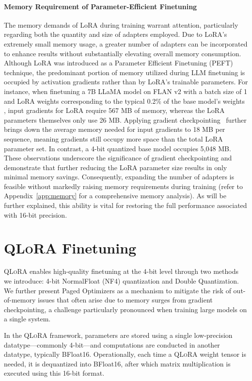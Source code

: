 \paragraph{Memory Requirement of Parameter-Efficient Finetuning} The memory demands of LoRA during training warrant attention, particularly regarding both the quantity and size of adapters employed. Due to LoRA’s extremely small memory usage, a greater number of adapters can be incorporated to enhance results without substantially elevating overall memory consumption. Although LoRA was introduced as a Parameter Efficient Finetuning (PEFT) technique, the predominant portion of memory utilized during LLM finetuning is occupied by activation gradients rather than by LoRA’s trainable parameters. For instance, when finetuning a 7B LLaMA model on FLAN v2 with a batch size of 1 and LoRA weights corresponding to the typical 0.2\% of the base model’s weights \citep{hu2021lora,liu2022few}, input gradients for LoRA require 567 MB of memory, whereas the LoRA parameters themselves only use 26 MB. Applying gradient checkpointing~\citep{chen2016training} further brings down the average memory needed for input gradients to 18 MB per sequence, meaning gradients still occupy more space than the total LoRA parameter set. In contrast, a 4-bit quantized base model occupies 5,048 MB. These observations underscore the significance of gradient checkpointing and demonstrate that further reducing the LoRA parameter size results in only minimal memory savings. Consequently, expanding the number of adapters is feasible without markedly raising memory requirements during training (refer to Appendix~\ref{app:memory} for a comprehensive memory analysis). As will be further explained, this ability is vital for restoring the full performance associated with 16-bit precision.

\section{\textsc{QLoRA} Finetuning}

\textsc{QLoRA} enables high-quality finetuning at the 4-bit level through two methods we introduce: 4-bit NormalFloat (NF4) quantization and Double Quantization. We further present Paged Optimizers as a mechanism to mitigate the risk of out-of-memory issues that often arise due to memory surges from gradient checkpointing, a challenge particularly pronounced when training large models on a single system.

In the \textsc{QLoRA} framework, parameters are stored using a single low-precision datatype—commonly 4-bit—and computations are conducted in another datatype, typically BFloat16. Operationally, each time a \textsc{QLoRA} weight tensor is needed, it is dequantized into BFloat16, after which matrix multiplication is executed using this 16-bit format.

